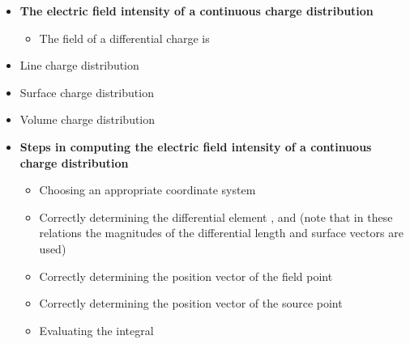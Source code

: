\begin{ELunit}


\begin{itemize}
\tightlist
\item
  \textbf{The electric field intensity of a continuous charge distribution}

  \begin{itemize}
  \tightlist
  \item
    The field of a differential charge  is
  \end{itemize}
\end{itemize}


\begin{itemize}
\tightlist
\item
  Line charge distribution
\end{itemize}


\begin{itemize}
\tightlist
\item
  Surface charge distribution
\end{itemize}


\begin{itemize}
\tightlist
\item
  Volume charge distribution
\end{itemize}


\begin{itemize}
\tightlist
\item
  \textbf{Steps in computing the electric field intensity of a continuous charge distribution}

  \begin{itemize}
  \tightlist
  \item
    Choosing an appropriate coordinate system
  \item
    Correctly determining the differential element ,  and  (note that in these relations the magnitudes of the differential length and surface vectors are used)
  \item
    Correctly determining the position vector of the field point 
  \item
    Correctly determining the position vector of the source point 
  \item
    Evaluating the integral


\end{itemize}
\end{itemize}
\end{ELunit}
